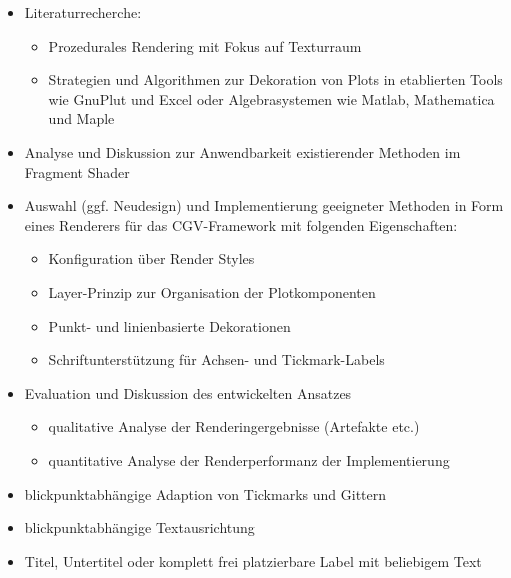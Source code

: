 \begin{task}[]
	\minisec{\focusname}\smallskip
	\begin{itemize}
		\item{Literaturrecherche:}
		\begin{itemize}
			\item{Prozedurales Rendering mit Fokus auf Texturraum}
			\item{Strategien und Algorithmen zur Dekoration von Plots in etablierten Tools wie GnuPlut
			und Excel oder Algebrasystemen wie Matlab, Mathematica und Maple}
		\end{itemize}
		\item{Analyse und Diskussion zur Anwendbarkeit existierender Methoden im Fragment Shader}
		\item{Auswahl (ggf. Neudesign) und Implementierung geeigneter Methoden in Form eines Renderers
		für das CGV-Framework mit folgenden Eigenschaften:}
		\begin{itemize}
			\item{Konfiguration über Render Styles}
			\item{Layer-Prinzip zur Organisation der Plotkomponenten}
			\item{Punkt- und linienbasierte Dekorationen}
			\item{Schriftunterstützung für Achsen- und Tickmark-Labels}
		\end{itemize}
		\item{Evaluation und Diskussion des entwickelten Ansatzes}
		\begin{itemize}
			\item{qualitative Analyse der Renderingergebnisse (Artefakte etc.)}
			\item{quantitative Analyse der Renderperformanz der Implementierung}
		\end{itemize}
	\end{itemize}
	
	\smallskip
	\begin{itemize}
		\item{blickpunktabhängige Adaption von Tickmarks und Gittern}
		\item{blickpunktabhängige Textausrichtung}
		\item{Titel, Untertitel oder komplett frei platzierbare Label mit beliebigem Text}
	\end{itemize}
	\bigskip
\end{task}

